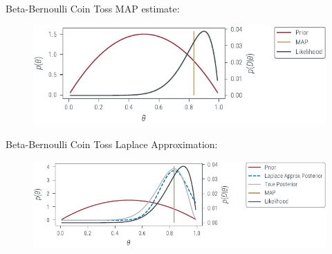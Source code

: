 \documentclass{beamer}
\begin{document}
\begin{frame}{Beta-Bernoulli Coin Toss}
    MAP estimate:
    \begin{figure}
        \includegraphics[]{../figures/laplace-approx/beta-prior-coin-toss-map.pdf}
    \end{figure}
\end{frame}

\begin{frame}{Beta-Bernoulli Coin Toss}
    Laplace Approximation:
    \begin{figure}
        \includegraphics[]{../figures/laplace-approx/beta-prior-coin-toss-laplace.pdf}
    \end{figure}
\end{frame}
\end{document}
